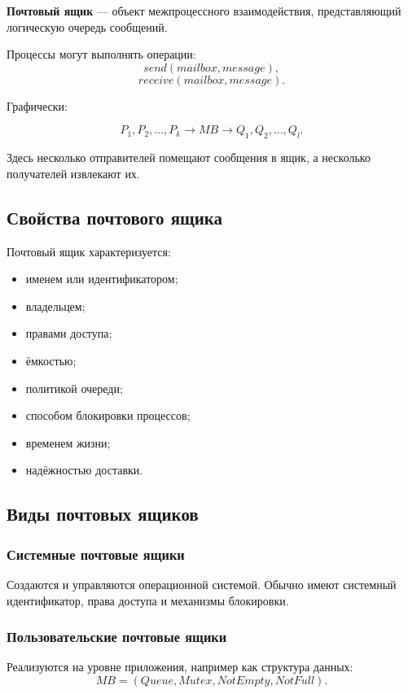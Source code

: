 \documentclass[12pt,a4paper]{article}
\begin{document}
\textbf{Почтовый ящик} --- объект межпроцессного взаимодействия, представляющий логическую очередь сообщений.

Процессы могут выполнять операции:
\[
send(mailbox, message),
\]
\[
receive(mailbox, message).
\]

Графически:

\[
P_1, P_2, \ldots, P_k
\rightarrow
MB
\rightarrow
Q_1, Q_2, \ldots, Q_l.
\]

Здесь несколько отправителей помещают сообщения в ящик, а несколько получателей извлекают их.

\subsection{Свойства почтового ящика}

Почтовый ящик характеризуется:
\begin{itemize}
    \item именем или идентификатором;
    \item владельцем;
    \item правами доступа;
    \item ёмкостью;
    \item политикой очереди;
    \item способом блокировки процессов;
    \item временем жизни;
    \item надёжностью доставки.
\end{itemize}

\subsection{Виды почтовых ящиков}

\subsubsection{Системные почтовые ящики}

Создаются и управляются операционной системой. Обычно имеют системный идентификатор, права доступа и механизмы блокировки.

\subsubsection{Пользовательские почтовые ящики}

Реализуются на уровне приложения, например как структура данных:
\[
MB = (Queue, Mutex, NotEmpty, NotFull).
\]
\end{document}
